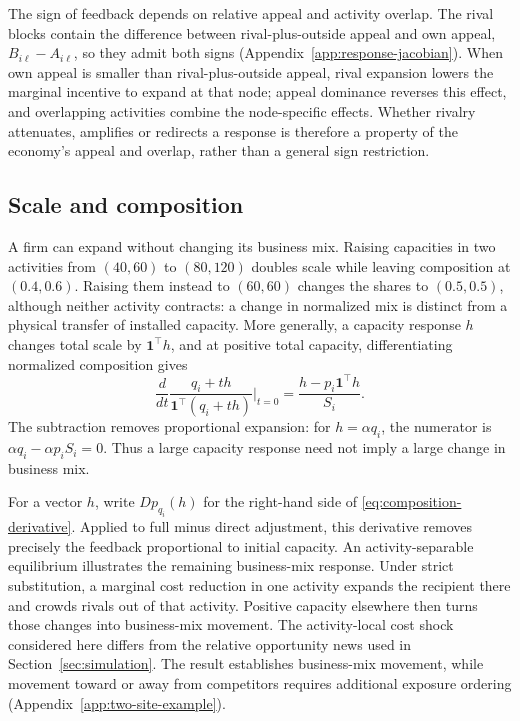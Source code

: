 The sign of feedback depends on relative appeal and activity overlap.
The rival blocks contain the difference between rival-plus-outside appeal
and own appeal, $B_{i\ell}-A_{i\ell}$, so they admit both signs
(Appendix~\ref{app:response-jacobian}).
When own appeal is smaller than rival-plus-outside appeal, rival expansion
lowers the marginal incentive to expand at that node; appeal dominance
reverses this effect, and overlapping activities combine the
node-specific effects.
Whether rivalry attenuates, amplifies or redirects a response is therefore a
property of the economy's appeal and overlap, rather than a general sign restriction.

\subsection{Scale and composition}\label{sec:model-composition}

A firm can expand without changing its business mix.
Raising capacities in two activities from $(40,60)$ to $(80,120)$ doubles
scale while leaving composition at $(0.4,0.6)$.
Raising them instead to $(60,60)$ changes the shares to $(0.5,0.5)$, although
neither activity contracts: a change in normalized mix is distinct from a
physical transfer of installed capacity.
More generally, a capacity response $h$ changes total scale by
$\mathbf1^\top h$, and at positive total capacity, differentiating normalized
composition gives
\begin{equation}\label{eq:composition-derivative}
  \frac{d}{dt}\frac{q_i+th}{\mathbf1^\top(q_i+th)}\bigg|_{t=0}
  =\frac{h-p_i\mathbf1^\top h}{S_i}.
\end{equation}
The subtraction removes proportional expansion: for $h=\alpha q_i$, the
numerator is $\alpha q_i-\alpha p_i S_i=0$.
Thus a large capacity response need not imply a large change in business mix.

For a vector $h$, write $D p_{q_i}(h)$ for the right-hand side of
\eqref{eq:composition-derivative}.
Applied to full minus direct adjustment, this derivative removes precisely
the feedback proportional to initial capacity.
An activity-separable equilibrium illustrates the remaining business-mix
response.
Under strict substitution, a marginal cost reduction in one activity expands
the recipient
there and crowds rivals out of that activity.
Positive capacity elsewhere then turns those changes into business-mix movement.
The activity-local cost shock considered here differs from the relative
opportunity news used in Section~\ref{sec:simulation}.
The result establishes business-mix movement, while movement toward or away
from competitors requires additional exposure ordering
(Appendix~\ref{app:two-site-example}).

